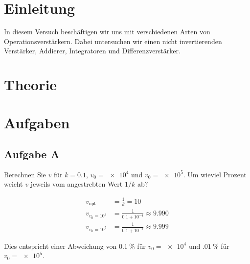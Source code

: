 \FloatBarrier
\section{Einleitung}

In diesem Versuch beschäftigen wir uns mit verschiedenen Arten von
Operationsverstärkern. Dabei untersuchen wir einen nicht invertierenden
Verstärker, Addierer, Integratoren und Differenzverstärker.


\FloatBarrier
\section{Theorie}



\FloatBarrier
\section{Aufgaben}

\FloatBarrier
\subsection{Aufgabe A}

\begin{problem}
	Berechnen Sie $v$ für $k = \num{0.1}$, $v_0 = \num{e4}$ und $v_0 =
	\num{e5}$. Um wieviel Prozent weicht $v$ jeweils vom angestrebten Wert $1 /
	k$ ab?
\end{problem}

\begin{align*}
    v_\text{opt} &= \frac 1k = 10 \\
	v_{v_0 = 10^4} &= \frac 1{\num{0.1} + 10^{-4}} \approx \num{9.990} \\
	v_{v_0 = 10^5} &= \frac 1{\num{0.1} + 10^{-5}} \approx \num{9.999}
\end{align*}

Dies entspricht einer Abweichung von $\SI{0.1}\percent$ für $v_0 = \num{e4}$
und $\SI{.01}\percent$ für $v_0 = \num{e5}$.


